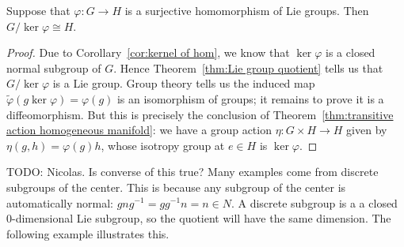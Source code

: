 \begin{theorem}
\label{thm:first iso}
Suppose that $\varphi: G \to H$ is a surjective homomorphism of Lie groups.
Then $G / \ker \varphi \cong H$.
\end{theorem}
\begin{proof}
Due to Corollary~\ref{cor:kernel of hom}, we know that $\ker \varphi$ is a closed normal subgroup of $G$.
Hence Theorem~\ref{thm:Lie group quotient} tells us that $G/\ker \varphi$ is a Lie group.
Group theory tells us the induced map $\tilde{\varphi}(g\ker\varphi) = \varphi(g)$ is an isomorphism of groups; it remains to prove it is a diffeomorphism.
But this is precisely the conclusion of Theorem~\ref{thm:transitive action homogeneous manifold}: we have a group action $\eta : G \times H \to H$ given by $\eta(g,h) = \varphi(g)h$, whose isotropy group at $e \in H$ is $\ker\varphi$.
\end{proof}

TODO: Nicolas. Is converse of this true?
Many examples come from discrete subgroups of the center.
This is because any subgroup of the center is automatically normal: $gng^{-1} = gg^{-1}n = n \in N$.
A discrete subgroup is a a closed $0$-dimensional Lie subgroup, so the quotient will have the same dimension.
The following example illustrates this.

